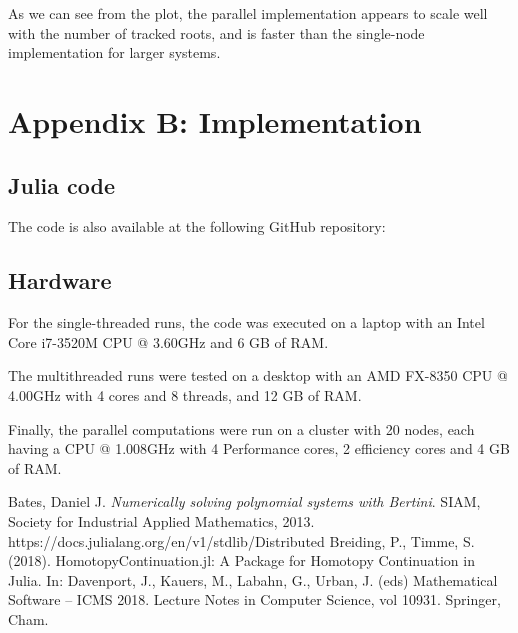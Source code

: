 \documentclass[a4paper]{article}
\theoremstyle{definition}
\theoremstyle{definition}
\theoremstyle{remark}
\theoremstyle{definition}
\begin{document}
As we can see from the plot, the parallel implementation appears to scale well with the number of tracked roots, and is faster than the single-node implementation for larger
systems.

\section{Appendix B: Implementation}
\subsection{Julia code}

The code is also available at the following GitHub repository:

\begin{center}
\end{center}

\label{sec:listing}
\label{sec:random}
\subsection{Hardware}\label{sec:hw}
For the single-threaded runs, the code was executed on a laptop with an Intel Core i7-3520M CPU @ 3.60GHz and 6 GB of RAM.

The multithreaded runs were tested on a desktop with an AMD FX-8350 CPU @ 4.00GHz with 4 cores and 8 threads, and 12 GB of RAM.

Finally, the parallel computations were run on a cluster with 20 nodes, each having a CPU @ 1.008GHz with 4 Performance cores, 2 efficiency cores and 4 GB of RAM.

 Bates, Daniel J. \textit{Numerically solving polynomial systems with Bertini}. SIAM, Society for Industrial Applied Mathematics, 2013.
 https://docs.julialang.org/en/v1/stdlib/Distributed
 Breiding, P., Timme, S. (2018). HomotopyContinuation.jl: A Package for Homotopy Continuation in Julia. In: Davenport, J., Kauers, M., Labahn, G., Urban, J. (eds) Mathematical Software – ICMS 2018. Lecture Notes in Computer Science, vol 10931. Springer, Cham.
\end{document}
